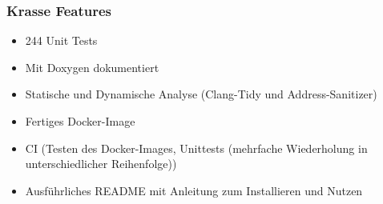 \documentclass[aspectratio=169]{beamer}
\begin{document}
\begin{frame}
    \frametitle{Krasse Features}
    \begin{itemize}
        \item 244 Unit Tests %
            \pause
        \item Mit Doxygen dokumentiert
            \pause
        \item Statische und Dynamische Analyse (Clang-Tidy und Address-Sanitizer)
            \pause
        \item Fertiges Docker-Image
            \pause
        \item CI (Testen des Docker-Images, Unittests (mehrfache Wiederholung in unterschiedlicher Reihenfolge))
            \pause
        \item Ausführliches README mit Anleitung zum Installieren und Nutzen
    \end{itemize}
\end{frame}
\end{document}
